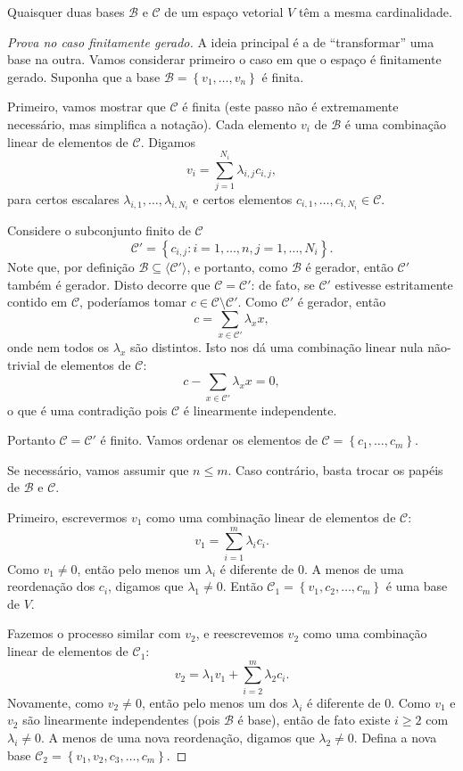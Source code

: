 \begin{theorem}
Quaisquer duas bases $\mathcal{B}$ e $\mathcal{C}$ de um espaço vetorial $V$ têm a mesma cardinalidade.
\end{theorem}

\begin{proof}[Prova no caso finitamente gerado]
A ideia principal é a de ``transformar'' uma base na outra. Vamos considerar primeiro o caso em que o espaço é finitamente gerado. Suponha que a base $\mathcal{B}=\left\{v_1,\ldots,v_n\right\}$ é finita.

Primeiro, vamos mostrar que $\mathcal{C}$ é finita (este passo não é extremamente necessário, mas simplifica a notação). Cada elemento $v_i$ de $\mathcal{B}$ é uma combinação linear de elementos de $\mathcal{C}$. Digamos
\[v_i=\sum_{j=1}^{N_i}\lambda_{i,j}c_{i,j},\]
para certos escalares $\lambda_{i,1},\ldots,\lambda_{i,N_i}$ e certos elementos $c_{i,1},\ldots,c_{i,N_i}\in\mathcal{C}$.

Considere o subconjunto finito de $\mathcal{C}$
\[\mathcal{C}'=\left\{c_{i,j}:i=1,\ldots,n,j=1,\ldots,N_i\right\}.\]
Note que, por definição $\mathcal{B}\subseteq\langle\mathcal{C}'\rangle$, e portanto, como $\mathcal{B}$ é gerador, então $\mathcal{C}'$ também é gerador. Disto decorre que $\mathcal{C}=\mathcal{C}'$: de fato, se $\mathcal{C}'$ estivesse estritamente contido em $\mathcal{C}$, poderíamos tomar $c\in\mathcal{C}\setminus\mathcal{C}'$. Como $\mathcal{C}'$ é gerador, então
\[c=\sum_{x\in\mathcal{C}'}\lambda_x x,\]
onde nem todos os $\lambda_x$ são distintos. Isto nos dá uma combinação linear nula não-trivial de elementos de $\mathcal{C}$:
\[c-\sum_{x\in\mathcal{C}'}\lambda_x x=0,\]
o que é uma contradição pois $\mathcal{C}$ é linearmente independente.

Portanto $\mathcal{C}=\mathcal{C}'$ é finito. Vamos ordenar os elementos de $\mathcal{C}=\left\{c_1,\ldots,c_m\right\}$.

Se necessário, vamos assumir que $n\leq m$. Caso contrário, basta trocar os papéis de $\mathcal{B}$ e $\mathcal{C}$.

Primeiro, escrevermos $v_1$ como uma combinação linear de elementos de $\mathcal{C}$:
\[v_1=\sum_{i=1}^m\lambda_i c_i.\]
Como $v_1\neq 0$, então pelo menos um $\lambda_i$ é diferente de $0$. A menos de uma reordenação dos $c_i$, digamos que $\lambda_1\neq 0$. Então $\mathcal{C}_1=\left\{v_1,c_2,\ldots,c_m\right\}$ é uma base de $V$.

Fazemos o processo similar com $v_2$, e reescrevemos $v_2$ como uma combinação linear de elementos de $\mathcal{C}_1$:
\[v_2=\lambda_1v_1+\sum_{i=2}^m\lambda_2c_i.\]
Novamente, como $v_2\neq 0$, então pelo menos um dos $\lambda_i$ é diferente de $0$. Como $v_1$ e $v_2$ são linearmente independentes (pois $\mathcal{B}$ é base), então de fato existe $i\geq 2$ com $\lambda_i\neq 0$. A menos de uma nova reordenação, digamos que $\lambda_2\neq 0$. Defina a nova base $\mathcal{C}_2=\left\{v_1,v_2,c_3,\ldots,c_m\right\}$.


\end{proof}
